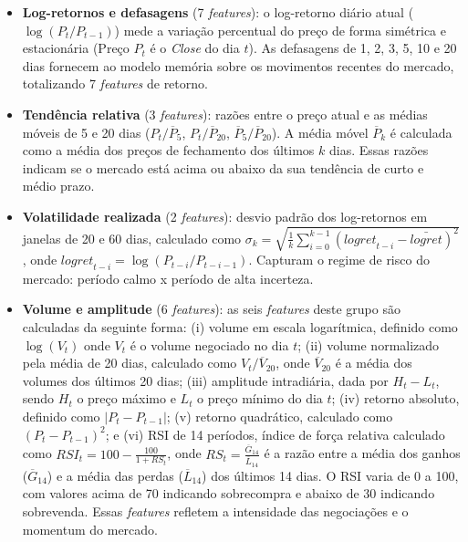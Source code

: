 \begin{itemize}
    \begin{itemize}
        \item \textbf{Log-retornos e defasagens} (7 \textit{features}): o log-retorno diário atual ($\log(P_t/P_{t-1})$) mede a variação percentual do preço de forma simétrica e estacionária (Preço $P_t$ é o \textit{Close} do dia $t$). As defasagens de 1, 2, 3, 5, 10 e 20 dias fornecem ao modelo memória sobre os movimentos recentes do mercado, totalizando 7 \textit{features} de retorno.
        \item \textbf{Tendência relativa} (3 \textit{features}): razões entre o preço atual e as médias móveis de 5 e 20 dias ($P_t / \overline{P}_5$, $P_t / \overline{P}_{20}$, $\overline{P}_5 / \overline{P}_{20}$). A média móvel $\overline{P}_k$ é calculada como a média dos preços de fechamento dos últimos $k$ dias. Essas razões indicam se o mercado está acima ou abaixo da sua tendência de curto e médio prazo.
        \item \textbf{Volatilidade realizada} (2 \textit{features}): desvio padrão dos log-retornos em janelas de 20 e 60 dias, calculado como $\sigma_k = \sqrt{\frac{1}{k}\sum_{i=0}^{k-1} (\textit{logret}_{t-i} - \bar{\textit{logret}})^2}$, onde $\textit{logret}_{t-i} = \log(P_{t-i}/P_{t-i-1})$. Capturam o regime de risco do mercado: período calmo x período de alta incerteza.
        \item \textbf{Volume e amplitude} (6 \textit{features}): as seis \textit{features} deste grupo são calculadas da seguinte forma: (i) volume em escala logarítmica, definido como $\log(V_t)$ onde $V_t$ é o volume negociado no dia $t$; (ii) volume normalizado pela média de 20 dias, calculado como $V_t / \overline{V}_{20}$, onde $\overline{V}_{20}$ é a média dos volumes dos últimos 20 dias; (iii) amplitude intradiária, dada por $H_t - L_t$, sendo $H_t$ o preço máximo e $L_t$ o preço mínimo do dia $t$; (iv) retorno absoluto, definido como $|P_t - P_{t-1}|$; (v) retorno quadrático, calculado como $(P_t - P_{t-1})^2$; e (vi) RSI de 14 períodos, índice de força relativa calculado como $\textit{RSI}_t = 100 - \frac{100}{1 + \textit{RS}_t}$, onde $\textit{RS}_t = \frac{\overline{G}_{14}}{\overline{L}_{14}}$ é a razão entre a média dos ganhos ($\overline{G}_{14}$) e a média das perdas ($\overline{L}_{14}$) dos últimos 14 dias. O RSI varia de 0 a 100, com valores acima de 70 indicando sobrecompra e abaixo de 30 indicando sobrevenda. Essas \textit{features} refletem a intensidade das negociações e o momentum do mercado.
    \end{itemize}


\end{itemize}
